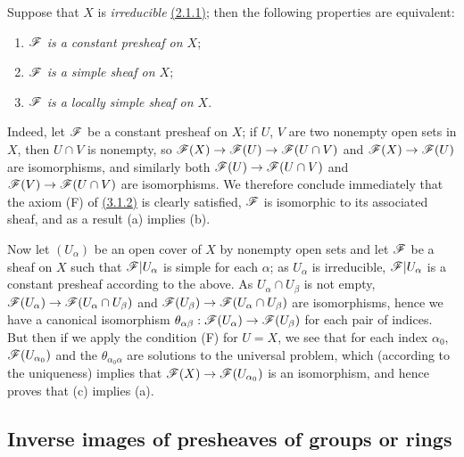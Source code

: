 \begin{env}[3.6.2]
\label{0.3.6.2}
Suppose that $X$ is {\em irreducible} \hyperref[0.2.1.1]{(2.1.1)}; then the following
properties are equivalent:
\begin{enumerate}[label=(\alph*)]
  \item {\em $\mathscr{F}$ is a constant presheaf on $X$};
  \item {\em $\mathscr{F}$ is a simple sheaf on $X$};
  \item {\em $\mathscr{F}$ is a locally simple sheaf on $X$}.
\end{enumerate}
\end{env}

Indeed, let $\mathscr{F}$ be a constant presheaf on $X$; if $U$, $V$ are two nonempty
open sets in $X$, then $U\cap V$ is nonempty, so
$\mathscr{F}(X)\to\mathscr{F}(U)\to\mathscr{F}(U\cap V)$ and $\mathscr{F}(X)\to\mathscr{F}(U)$ are
isomorphisms, and similarly both $\mathscr{F}(U)\to\mathscr{F}(U\cap V)$ and
$\mathscr{F}(V)\to\mathscr{F}(U\cap V)$ are isomorphisms. We therefore conclude
immediately that the axiom (F) of \hyperref[0.3.1.2]{(3.1.2)} is clearly satisfied,
$\mathscr{F}$ is isomorphic to its associated sheaf, and as a result (a) implies (b).

Now let $(U_\alpha)$ be an open cover of $X$ by nonempty open sets and let
$\mathscr{F}$ be a sheaf on $X$ such that $\mathscr{F}|U_\alpha$ is simple for each
$\alpha$; as $U_\alpha$ is irreducible, $\mathscr{F}|U_\alpha$ is a constant presheaf
according to the above. As $U_\alpha\cap U_\beta$ is not empty,
$\mathscr{F}(U_\alpha)\to\mathscr{F}(U_\alpha\cap U_\beta)$ and
$\mathscr{F}(U_\beta)\to\mathscr{F}(U_\alpha\cap U_\beta)$ are isomorphisms, hence we have
a canonical isomorphism
$\theta_{\alpha\beta}:\mathscr{F}(U_\alpha)\to\mathscr{F}(U_\beta)$ for each pair of
indices. But then if we apply the condition (F) for $U=X$, we see that for each
index $\alpha_0$, $\mathscr{F}(U_{\alpha_0})$ and the $\theta_{\alpha_0\alpha}$ are
solutions to the universal problem, which (according to the uniqueness) implies
that $\mathscr{F}(X)\to\mathscr{F}(U_{\alpha_0})$ is an isomorphism, and hence proves that
(c) implies (a).

\subsection{Inverse images of presheaves of groups or rings}
\label{subsection-inverse-images-of-psh-grps-or-rings}

